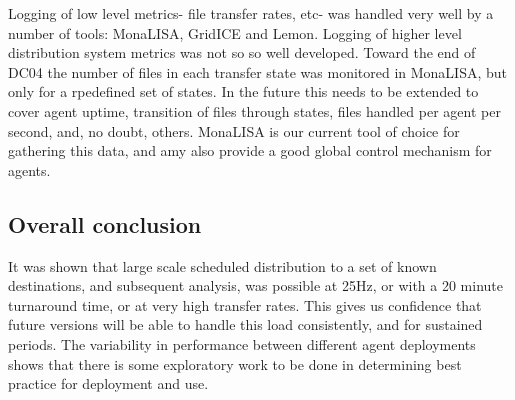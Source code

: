 \documentclass{cmspaper}
\begin{document}
Logging of low level metrics- file transfer rates, etc- was handled very well by a number
of tools: MonaLISA, GridICE and Lemon. Logging of higher level distribution system metrics
was not so so well developed. Toward the end of DC04 the number of files in each transfer 
state was monitored in MonaLISA, but only for a rpedefined set of states. In the future
this needs to be extended to cover agent uptime, transition of files through states, files
handled per agent per second, and, no doubt, others. MonaLISA is our current tool of 
choice for gathering this data, and amy also provide a good global control mechanism for
agents.

\subsection{Overall conclusion}
It was shown that large scale scheduled distribution to a set of known destinations, and
subsequent analysis, was possible at 25Hz, or with a 20 minute turnaround time, or at
very high transfer rates. This gives us confidence that future versions will be able to 
handle this load consistently, and for sustained periods. The variability in performance
between different agent deployments shows that there is some exploratory work to be done
in determining best practice for deployment and use.



\end{document}
